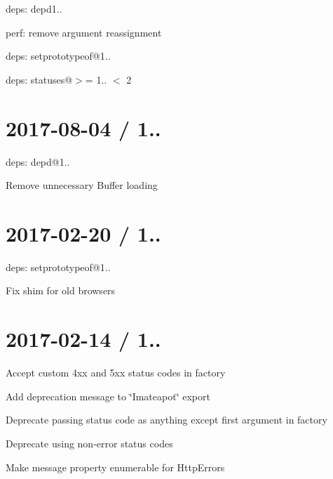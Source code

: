 
\begin{DoxyItemize}
\item deps\+: depd1..
\begin{DoxyItemize}
\item perf\+: remove argument reassignment
\end{DoxyItemize}
\item deps\+: setprototypeof@1..
\item deps\+: statuses@\textquotesingle{}$>$= 1.. $<$ 2\textquotesingle{}
\end{DoxyItemize}

\section*{2017-\/08-\/04 / 1.. }


\begin{DoxyItemize}
\item deps\+: depd@1..
\begin{DoxyItemize}
\item Remove unnecessary {\ttfamily Buffer} loading
\end{DoxyItemize}
\end{DoxyItemize}

\section*{2017-\/02-\/20 / 1.. }


\begin{DoxyItemize}
\item deps\+: setprototypeof@1..
\begin{DoxyItemize}
\item Fix shim for old browsers
\end{DoxyItemize}
\end{DoxyItemize}

\section*{2017-\/02-\/14 / 1.. }


\begin{DoxyItemize}
\item Accept custom 4xx and 5xx status codes in factory
\item Add deprecation message to {\ttfamily \char`\"{}\+I\textquotesingle{}mateapot\char`\"{}} export
\item Deprecate passing status code as anything except first argument in factory
\item Deprecate using non-\/error status codes
\item Make {\ttfamily message} property enumerable for {\ttfamily Http\+Error}s
\end{DoxyItemize}

